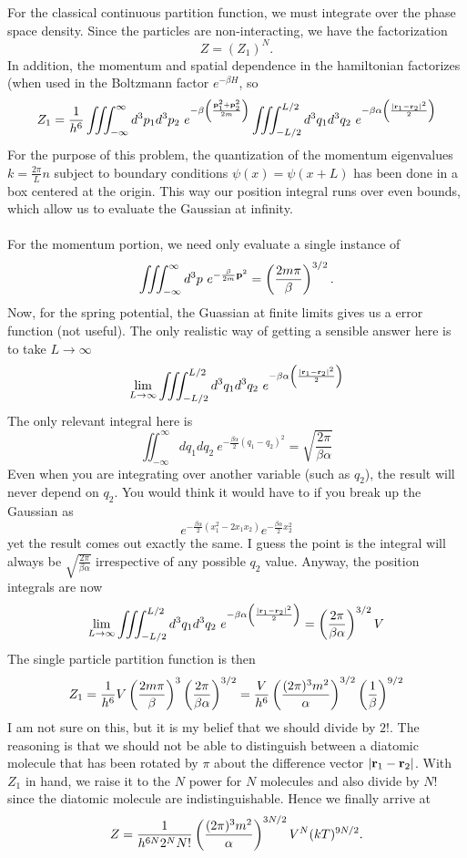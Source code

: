 \documentclass[10pt,letterpaper]{article}
\begin{document}
	\benum
	\item 
	For the classical continuous partition function, we must integrate over the phase space density. Since
	the particles are non-interacting, we have the factorization
	\[
		Z = (Z_1)^N.
	\]
	In addition, the momentum and spatial dependence in the hamiltonian factorizes (when used in
	the Boltzmann factor $e^{-\beta H}$, so
	\[
		Z_1 = \frac{1}{h^6}\iiint_{-\infty}^{\infty} d^3p_1d^3p_2\  e^{-\beta\left(\frac{\mathbf{p}_1^2+\mathbf{p}_2^2}{2m}\right)}
		\iiint_{-L/2}^{L/2}d^3q_1d^3q_2\  e^{-\beta\alpha\left(\frac{|\mathbf{r}_1-\mathbf{r}_2|^2}{2}\right)}
	\]
	For the purpose of this problem, the quantization of the momentum eigenvalues $k=\frac{2\pi}{L}n$
	subject to boundary conditions $\psi(x) = \psi(x+L)$ has been done in a box centered at the origin. This
	way our position integral runs over even bounds, which allow us to evaluate the Gaussian at infinity. 
	\\ \\
	For the momentum portion, we need only evaluate a single instance of 
	\[
		\iiint_{-\infty}^{\infty} d^3p\ e^{-\frac{\beta}{2m}\vect p^2} = \pfrac{2m\pi}{\beta}^{3/2}.
	\]
	Now, for the spring potential, the Guassian at finite limits gives us a error function (not useful). The only 
	realistic way of getting a sensible answer here is to take $L\to \infty$
	\[
		\lim_{L\to\infty} \iiint_{-L/2}^{L/2}d^3q_1d^3q_2\  e^{-\beta\alpha\left(\frac{|\mathbf{r}_1-\mathbf{r}_2|^2}{2}\right)}
	\]
	The only relevant integral here is
	\[
		\iint_{-\infty}^\infty dq_1dq_2\ e^{-\frac{\beta\alpha}{2}(q_1-q_2)^2} = \sqrt{\frac{2\pi}{\beta\alpha}}
	\]
	Even when you are integrating over another variable (such as $q_2$), the result will never
	depend on $q_2$. You would think it would have to if you break up the Gaussian as
	\[
		e^{-\frac{\beta\alpha}{2}(x_1^2-2x_1x_2)}e^{-\frac{\beta\alpha}{2}x_2^2}
	\]
	yet the result comes out exactly the same. I guess the point is the integral will always be 
	$\sqrt{\frac{2\pi}{\beta\alpha}}$ irrespective of any possible $q_2$ value. Anyway, the 
	position integrals are now
	\[
		\lim_{L\to\infty} \iiint_{-L/2}^{L/2}d^3q_1d^3q_2\  e^{-\beta\alpha\left(\frac{|\mathbf{r}_1-\mathbf{r}_2|^2}{2}\right)}
	 	= \left(\frac{2\pi}{\beta\alpha}\right)^{3/2}V
	\]
	The single particle partition function is then
	\[
		Z_1 = \frac{1}{h^6}V\left(\frac{2m\pi}{\beta}\right)^{3}\left(\frac{2\pi}{\beta\alpha}\right)^{3/2}
		= \frac{V}{h^6}\left(\frac{(2\pi)^3m^2}{\alpha}\right)^{3/2}\left(\frac{1}{\beta}\right)^{9/2}
	\]
	I am not sure on this, but it is my belief that we should divide by $2!$. The reasoning is that we should
	not be able to distinguish between a diatomic molecule that has been rotated by $\pi$ about the difference
	vector $|\mathbf{r}_1-\mathbf{r}_2|$. With $Z_1$ in hand, we raise it to the $N$ power for $N$ molecules
	and also divide by $N!$ since the diatomic molecule are indistinguishable. Hence we
	finally arrive at
	\[
		Z = \frac{1}{h^{6N}2^NN!}\left(\frac{(2\pi)^3m^2}{\alpha}\right)^{3N/2} V^N (kT)^{9N/2}.
	\]
	\\ \\
	
\end{document}
